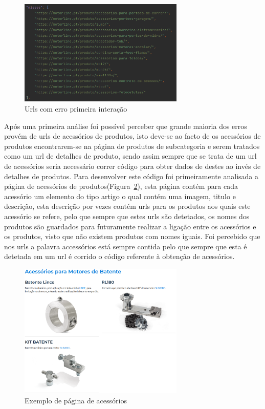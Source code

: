 \begin{figure}[htb]
    \centering
    
    \includegraphics[width=0.7\textwidth]{images/implementacao/scraper/urls_erro_iteracao_1.png}
    \caption{Urls com erro primeira interação}
    \label{fig:57}
\end{figure}

Após uma primeira análise foi possível perceber que grande maioria dos erros provém de urls de acessórios de produtos, isto deve-se ao facto de os acessórios de produtos encontrarem-se
na página de produtos de subcategoria e serem tratados como um url de detalhes de produto, sendo assim sempre que se trata de um url de acessórios seria necessário correr código para 
obter dados de destes ao invés de detalhes de produtos. Para desenvolver este código foi primeiramente analisada a página de acessórios de produtos(Figura~\ref*{fig:58}), 
esta página contém para cada acessório um elemento do tipo artigo o qual contém uma imagem, titulo e descrição, esta descrição por vezes contém urls para os produtos aos quais este acessório se refere, pelo que sempre que estes
urls são detetados, os nomes dos produtos são guardados para futuramente realizar a ligação entre os acessórios e os produtos, visto que não existem produtos com nomes iguais. Foi percebido que nos urls a palavra accessórios está 
sempre contida pelo que sempre que esta é detetada em um url é corrido o código referente à obtenção de acessórios.

\begin{figure}[htb]
    \centering
    
    \includegraphics[width=0.7\textwidth]{images/implementacao/scraper/pagina_acessorios.png}
    \caption{Exemplo de página de acessórios}
    \label{fig:58}
\end{figure}

